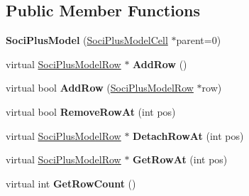 \subsection*{Public Member Functions}
\begin{DoxyCompactItemize}
\item 
\hypertarget{class_soci_plus_1_1_soci_plus_model_aca70ed0e79c366a1b4eceebc88812238}{{\bfseries Soci\+Plus\+Model} (\hyperlink{class_soci_plus_1_1_soci_plus_model_cell}{Soci\+Plus\+Model\+Cell} $\ast$parent=0)}\label{class_soci_plus_1_1_soci_plus_model_aca70ed0e79c366a1b4eceebc88812238}

\item 
\hypertarget{class_soci_plus_1_1_soci_plus_model_abfe63fea6999b82870210fd380a2f186}{virtual \hyperlink{class_soci_plus_1_1_soci_plus_model_row}{Soci\+Plus\+Model\+Row} $\ast$ {\bfseries Add\+Row} ()}\label{class_soci_plus_1_1_soci_plus_model_abfe63fea6999b82870210fd380a2f186}

\item 
\hypertarget{class_soci_plus_1_1_soci_plus_model_a62a53eb94880cf17b44e3b3d4c493249}{virtual bool {\bfseries Add\+Row} (\hyperlink{class_soci_plus_1_1_soci_plus_model_row}{Soci\+Plus\+Model\+Row} $\ast$row)}\label{class_soci_plus_1_1_soci_plus_model_a62a53eb94880cf17b44e3b3d4c493249}

\item 
\hypertarget{class_soci_plus_1_1_soci_plus_model_a96ac7c246892ddf7a5973c477eec0108}{virtual bool {\bfseries Remove\+Row\+At} (int pos)}\label{class_soci_plus_1_1_soci_plus_model_a96ac7c246892ddf7a5973c477eec0108}

\item 
\hypertarget{class_soci_plus_1_1_soci_plus_model_a31340e9ae3b5d00e30d1849856fbc763}{virtual \hyperlink{class_soci_plus_1_1_soci_plus_model_row}{Soci\+Plus\+Model\+Row} $\ast$ {\bfseries Detach\+Row\+At} (int pos)}\label{class_soci_plus_1_1_soci_plus_model_a31340e9ae3b5d00e30d1849856fbc763}

\item 
\hypertarget{class_soci_plus_1_1_soci_plus_model_a56d98da17da9aacca90da2bc076e8f59}{virtual \hyperlink{class_soci_plus_1_1_soci_plus_model_row}{Soci\+Plus\+Model\+Row} $\ast$ {\bfseries Get\+Row\+At} (int pos)}\label{class_soci_plus_1_1_soci_plus_model_a56d98da17da9aacca90da2bc076e8f59}

\item 
\hypertarget{class_soci_plus_1_1_soci_plus_model_aa5fc092c0b75fdd39b8ba2b1d83269da}{virtual int {\bfseries Get\+Row\+Count} ()}\label{class_soci_plus_1_1_soci_plus_model_aa5fc092c0b75fdd39b8ba2b1d83269da}


\end{DoxyCompactItemize}
